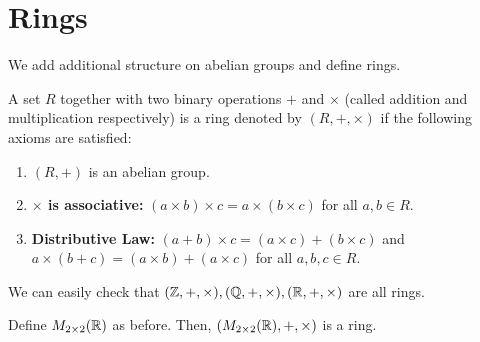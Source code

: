 \section{Rings}
We add additional structure on abelian groups and define rings.
\begin{definition}[Ring]
    A set $R$ together with two binary operations $+$ and $\times$ (called addition and multiplication respectively) is a ring denoted by $(R, +, \times)$ if the following axioms are satisfied:
    \begin{enumerate}
        \item $(R, +)$ is an abelian group.
        \item \textbf{$\times$ is associative:} $(a \times b) \times c = a \times (b \times c)$ for all $a, b \in R$.
        \item \textbf{Distributive Law:} $(a + b) \times c = (a \times c) + (b 
        \times c)$ and $a \times (b + c) = (a \times b) + (a 
        \times c)$ for all $a, b, c \in R$.
    \end{enumerate}
\end{definition}
\begin{eg}
    We can easily check that $(\mathbb{Z}, +, \times), (\mathbb{Q}, +, \times), (\mathbb{R}, +, \times)$ are all rings.
\end{eg}
\begin{eg}
    Define $M_{2\times 2}(\mathbb{R})$ as before. Then, $(M_{2\times 2}(\mathbb{R}), +, \times)$ is a ring.
\end{eg}
